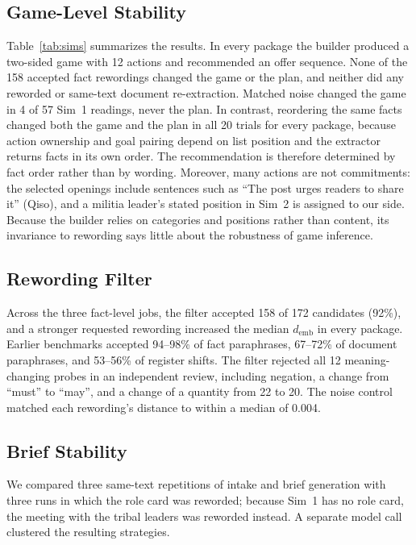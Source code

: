 \documentclass[10pt,twocolumn,letterpaper]{article}
\begin{document}
\subsection{Game-Level Stability}
Table~\ref{tab:sims} summarizes the results. In every package the builder produced a two-sided game with 12 actions and recommended an offer sequence. None of the 158 accepted fact rewordings changed the game or the plan, and neither did any reworded or same-text document re-extraction. Matched noise changed the game in 4 of 57 Sim~1 readings, never the plan. In contrast, reordering the same facts changed both the game and the plan in all 20 trials for every package, because action ownership and goal pairing depend on list position and the extractor returns facts in its own order. The recommendation is therefore determined by fact order rather than by wording. Moreover, many actions are not commitments: the selected openings include sentences such as ``The post urges readers to share it'' (Qiso), and a militia leader's stated position in Sim~2 is assigned to our side. Because the builder relies on categories and positions rather than content, its invariance to rewording says little about the robustness of game inference.

\subsection{Rewording Filter}
Across the three fact-level jobs, the filter accepted 158 of 172 candidates (92\%), and a stronger requested rewording increased the median $d_{\text{emb}}$ in every package. Earlier benchmarks accepted 94--98\% of fact paraphrases, 67--72\% of document paraphrases, and 53--56\% of register shifts. The filter rejected all 12 meaning-changing probes in an independent review, including negation, a change from ``must'' to ``may'', and a change of a quantity from 22 to 20. The noise control matched each rewording's distance to within a median of 0.004.

\subsection{Brief Stability}
We compared three same-text repetitions of intake and brief generation with three runs in which the role card was reworded; because Sim~1 has no role card, the meeting with the tribal leaders was reworded instead. A separate model call clustered the resulting strategies.
\end{document}
